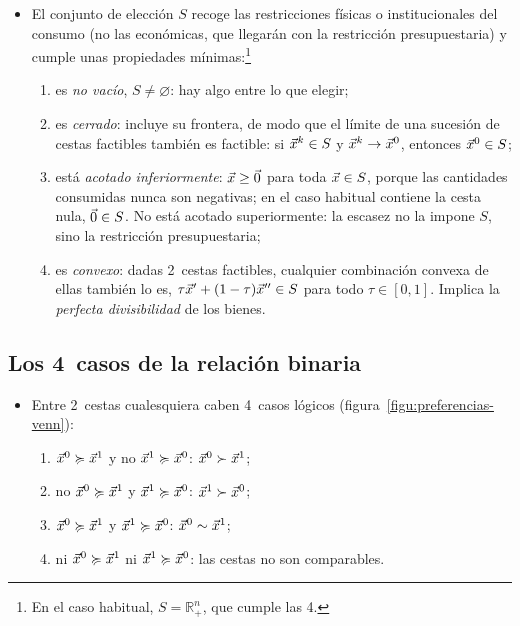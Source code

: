 \documentclass[11pt]{article}
\begin{document}
\begin{itemize}
\item El conjunto de elección $S$ recoge las restricciones físicas o institucionales del consumo (no las económicas, que llegarán con la restricción presupuestaria) y cumple unas propiedades mínimas:\footnote{En el caso habitual, $S=\mathbb{R}^n_+$, que cumple las 4\nocite{MasColellWhinstonGreen1995}.}
    \begin{enumerate}
    \item es \emph{no vacío}, $S\neq\varnothing$: hay algo entre lo que elegir;
    \item es \emph{cerrado}: incluye su frontera, de modo que el límite de una sucesión de cestas factibles también es factible: si $\vec{x}^k\in S$ y $\vec{x}^k\rightarrow \vec{x}^0$, entonces $\vec{x}^0\in S$;
    \item está \emph{acotado inferiormente}: $\vec{x}\geq\vec{0}$ para toda $\vec{x}\in S$, porque las cantidades consumidas nunca son negativas; en el caso habitual contiene la cesta nula, $\vec{0}\in S$. No está acotado superiormente: la escasez no la impone $S$, sino la restricción presupuestaria;
    \item es \emph{convexo}: dadas 2~cestas factibles, cualquier combinación convexa de ellas también lo es, $\tau \vec{x}'+(1-\tau)\vec{x}''\in S$ para todo $\tau\in[0,1]$. Implica la \emph{perfecta divisibilidad} de los bienes.
    \end{enumerate}
  \end{itemize}

\subsection{Los 4~casos de la relación binaria}\label{anexo:casos-relacion}

\begin{itemize}
\item Entre 2~cestas cualesquiera caben 4~casos lógicos (figura~\ref{figu:preferencias-venn}):
    \begin{enumerate}
    \item $\vec{x}^0\succcurlyeq \vec{x}^1$ y no $\vec{x}^1\succcurlyeq \vec{x}^0$: $\vec{x}^0\succ \vec{x}^1$;
    \item no $\vec{x}^0\succcurlyeq \vec{x}^1$ y $\vec{x}^1\succcurlyeq \vec{x}^0$: $\vec{x}^1\succ \vec{x}^0$;
    \item $\vec{x}^0\succcurlyeq \vec{x}^1$ y $\vec{x}^1\succcurlyeq \vec{x}^0$: $\vec{x}^0\sim \vec{x}^1$;
    \item ni $\vec{x}^0\succcurlyeq \vec{x}^1$ ni $\vec{x}^1\succcurlyeq \vec{x}^0$: las cestas no son comparables.
    \end{enumerate}
\end{itemize}
\end{document}

